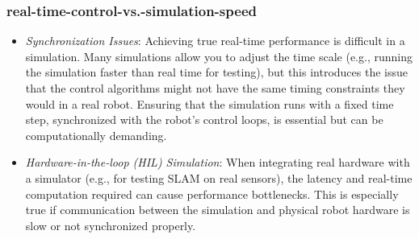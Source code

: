 \documentclass[../../main]{subfiles}
\begin{document}
    \subsubsection{real-time-control-vs.-simulation-speed}
    \begin{itemize}
    \item
      \emph{Synchronization Issues}: Achieving true real-time performance
      is difficult in a simulation. Many simulations allow you to adjust the
      time scale (e.g., running the simulation faster than real time for
      testing), but this introduces the issue that the control algorithms
      might not have the same timing constraints they would in a real robot.
      Ensuring that the simulation runs with a fixed time step, synchronized
      with the robot's control loops, is essential but can be
      computationally demanding.
    \item
      \emph{Hardware-in-the-loop (HIL) Simulation}: When integrating real
      hardware with a simulator (e.g., for testing SLAM on real sensors),
      the latency and real-time computation required can cause performance
      bottlenecks. This is especially true if communication between the
      simulation and physical robot hardware is slow or not synchronized
      properly.
    \end{itemize}
\end{document}
